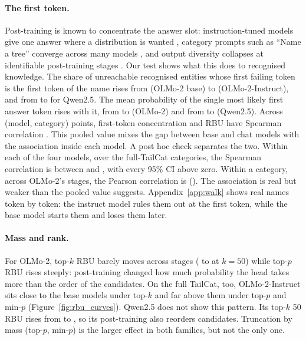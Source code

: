 \documentclass[11pt]{article}
\begin{document}


\paragraph{The first token.} Post-training is known to concentrate the answer slot: instruction-tuned models give one answer where a distribution is wanted \citep{jang2026instruction}, category prompts such as ``Name a tree'' converge across many models \citep{parikh2026census}, and output diversity collapses at identifiable post-training stages \citep{karouzos2026diversity}. Our test shows what this does to recognised knowledge. The share of unreachable recognised entities whose first failing token is the first token of the name rises from \goFirstTokOlmoBase{} (OLMo-2 base) to \goFirstTokOlmoInst{} (OLMo-2-Instruct), and from \gzQwenBaseFirstTok{} to \gzQwenInstFirstTok{} for Qwen2.5. The mean probability of the single most likely first answer token rises with it, from \goTopOneOlmoBase{} to \goTopOneOlmoInst{} (OLMo-2) and from \goTopOneQwenBase{} to \goTopOneQwenInst{} (Qwen2.5). Across \goSpearmanN{} (model, category) points, first-token concentration and RBU have Spearman correlation \goSpearman{}. This pooled value mixes the gap between base and chat models with the association inside each model. A post hoc check separates the two. Within each of the four models, over the \ptCategories{} full-TailCat categories, the Spearman correlation is between \ctMechWithinScaleMin{} and \ctMechWithinScaleMax{}, with every 95\% CI above zero. Within a category, across OLMo-2's stages, the Pearson correlation is \ctMechStagesFE{} (\ctMechStagesFECI{}). The association is real but weaker than the pooled value suggests. Appendix~\ref{app:walk} shows real names token by token: the instruct model rules them out at the first token, while the base model starts them and loses them later.

\paragraph{Mass and rank.} For OLMo-2, top-$k$ RBU barely moves across stages (\goKfiftyOlmoBase{} to \goKfiftyOlmoInst{} at $k=50$) while top-$p$ RBU rises steeply: post-training changed how much probability the head takes more than the order of the candidates. On the full TailCat, too, OLMo-2-Instruct sits close to the base models under top-$k$ and far above them under top-$p$ and min-$p$ (Figure~\ref{fig:rbu_curves}). Qwen2.5 does not show this pattern. Its top-$k$ 50 RBU rises from \goKfiftyQwenBase{} to \goKfiftyQwenInst{}, so its post-training also reorders candidates. Truncation by mass (top-$p$, min-$p$) is the larger effect in both families, but not the only one.
\end{document}
